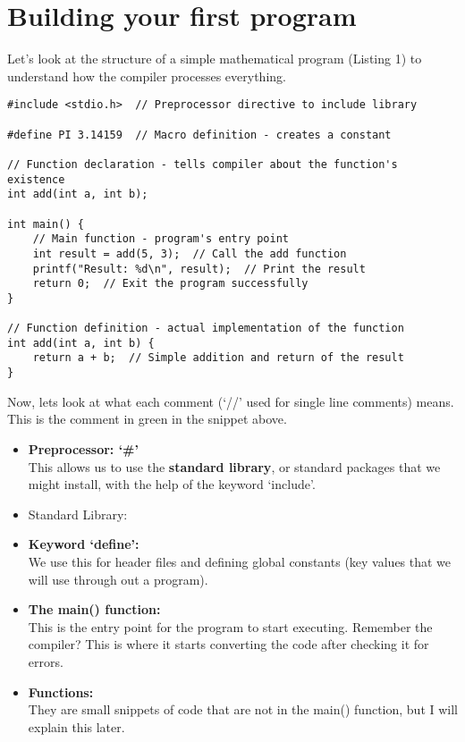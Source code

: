 \documentclass[a4paper,12pt]{article}
\begin{document}
\newpage

\section{Building your first program}
Let's look at the structure of a simple mathematical program (Listing 1) to understand how the compiler processes everything.

\lstset{language=C}
\begin{lstlisting}[caption=First program]
#include <stdio.h>  // Preprocessor directive to include library

#define PI 3.14159  // Macro definition - creates a constant

// Function declaration - tells compiler about the function's existence
int add(int a, int b);

int main() {
    // Main function - program's entry point
    int result = add(5, 3);  // Call the add function
    printf("Result: %d\n", result);  // Print the result
    return 0;  // Exit the program successfully
}

// Function definition - actual implementation of the function
int add(int a, int b) {
    return a + b;  // Simple addition and return of the result
}\end{lstlisting}

Now, lets look at what each comment (`\textcolor{codegreen}{//}' used for single line comments) means. \textcolor{codegreen}{This is the comment in green in the snippet above.}
\begin{itemize}
    \item \textbf{Preprocessor: `\#'}\\
    This allows us to use the \textbf{standard library}, or standard packages that we might install, with the help of the keyword `include'.
    \item Standard Library:
    
    \item \textbf{Keyword `define':}\\
    We use this for header files and defining global constants (key values that we will use through out a program). 
    \item \textbf{The main() function:}\\
    This is the entry point for the program to start executing. Remember the compiler? This is where it starts converting the code after checking it for errors.
    \item \textbf{Functions:}\\
    They are small snippets of code that are not in the main() function, but I will explain this later.
\end{itemize}
\end{document}
